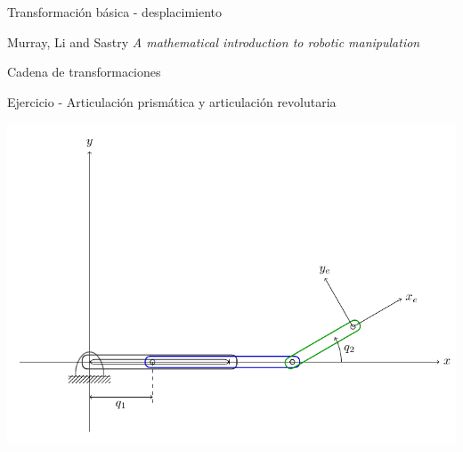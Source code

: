 \documentclass[presentation,aspectratio=169]{beamer}
\begin{document}
\begin{frame}[label={sec:org3b7e7e7}]{Transformación básica - desplacimiento}
\begin{center}

\footnotesize Murray, Li and Sastry \emph{A mathematical introduction to robotic manipulation}
\end{center}
\end{frame}

\begin{frame}[label={sec:org26307b6}]{Cadena de transformaciones}
\end{frame}

\begin{frame}[label={sec:org884379c}]{Ejercicio - Articulación prismática y articulación revolutaria}
\begin{center}
 \includegraphics[height=0.8\textheight]{../figures/2d-2dof-prismatic-revolute.pdf}
\end{center}
\end{frame}
\end{document}
